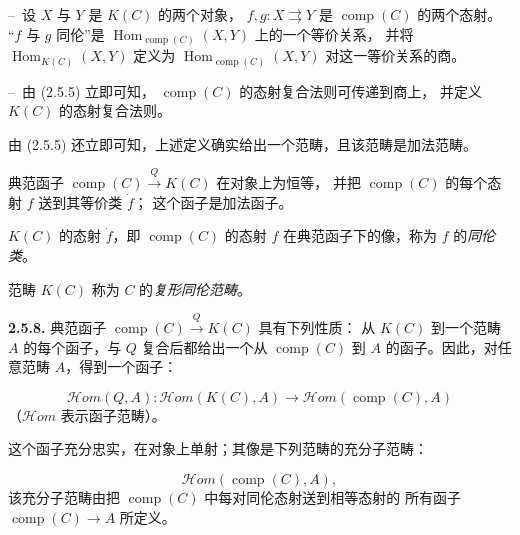 \clearpage
{}%
\noindent\hspace*{2em}--\ 设 $X$ 与 $Y$ 是 $K(C)$ 的两个对象，
$f,g\colon X\rightrightarrows Y$ 是 $\operatorname{comp}(C)$ 的两个态射。
“$f$ 与 $g$ 同伦”是
$\operatorname{Hom}_{\operatorname{comp}(C)}(X,Y)$ 上的一个等价关系，
并将 $\operatorname{Hom}_{K(C)}(X,Y)$ 定义为
$\operatorname{Hom}_{\operatorname{comp}(C)}(X,Y)$ 对这一等价关系的商。

\noindent\hspace*{2em}--\ 由 (2.5.5) 立即可知，
$\operatorname{comp}(C)$ 的态射复合法则可传递到商上，
并定义 $K(C)$ 的态射复合法则。

由 (2.5.5) 还立即可知，上述定义确实给出一个范畴，且该范畴是加法范畴。

典范函子
$\operatorname{comp}(C)\xrightarrow{Q}K(C)$ 在对象上为恒等，
并把 $\operatorname{comp}(C)$ 的每个态射 $f$ 送到其等价类 $\dot f$；
这个函子是加法函子。

$K(C)$ 的态射 $\dot f$，即 $\operatorname{comp}(C)$ 的态射 $f$
在典范函子下的像，称为 $f$ 的\emph{同伦类}。

范畴 $K(C)$ 称为 $C$ 的\emph{复形同伦范畴}。

\noindent\textbf{2.5.8.}\quad
典范函子 $\operatorname{comp}(C)\xrightarrow{Q}K(C)$ 具有下列性质：
从 $K(C)$ 到一个范畴 $A$ 的每个函子，与 $Q$ 复合后都给出一个从
$\operatorname{comp}(C)$ 到 $A$ 的函子。因此，对任意范畴 $A$，得到一个函子：

\begin{equation*}
  \mathcal H\!om(Q,A)\colon
  \mathcal H\!om(K(C),A)
  \longrightarrow
  \mathcal H\!om(\operatorname{comp}(C),A)
\end{equation*}
（$\mathcal H\!om$ 表示函子范畴）。

这个函子充分忠实，在对象上单射；其像是下列范畴的充分子范畴：

\begin{equation*}
  \mathcal H\!om(\operatorname{comp}(C),A),
\end{equation*}
该充分子范畴由把 $\operatorname{comp}(C)$ 中每对同伦态射送到相等态射的
所有函子 $\operatorname{comp}(C)\longrightarrow A$ 所定义。

